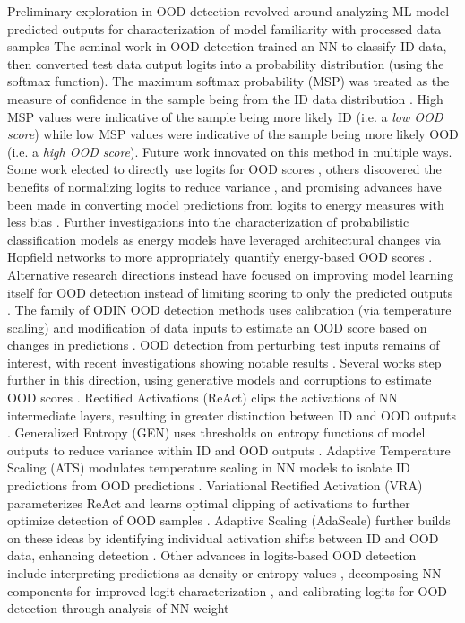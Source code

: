 Preliminary exploration in OOD detection revolved around analyzing ML model predicted outputs for characterization of model familiarity with processed data samples \cite{yang2024generalized,lu2024recent} The seminal work in OOD detection trained an NN to classify ID data, then converted test data output logits into a probability distribution (using the softmax function). The maximum softmax probability (MSP) was treated as the measure of confidence in the sample being from the ID data distribution \cite{hendrycks2017baseline}. High MSP values were indicative of the sample being more likely ID (i.e. a \textit{low OOD score}) while low MSP values were indicative of the sample being more likely OOD (i.e. a \textit{high OOD score}). Future work innovated on this method in multiple ways. Some work elected to directly use logits for OOD scores \cite{hendrycks2019scaling}, others discovered the benefits of normalizing logits to reduce variance \cite{wei2022mitigating}, and promising advances have been made in converting model predictions from logits to energy measures with less bias \cite{liu2020energy,wang2021energy,chen2025dual}. Further investigations into the characterization of probabilistic classification models as energy models have leveraged architectural changes via Hopfield networks to more appropriately quantify energy-based OOD scores \cite{zhang2022out,hofmann2024energy,hofmannenergy,moriai2025rectified}. Alternative research directions instead have focused on improving model learning itself for OOD detection instead of limiting scoring to only the predicted outputs \cite{liu2024fast}. The family of ODIN OOD detection methods uses calibration (via temperature scaling) and modification of data inputs to estimate an OOD score based on changes in predictions \cite{liang2017enhancing,hsu2020generalized}. OOD detection from perturbing test inputs remains of interest, with recent investigations showing notable results \cite{chen2025leveraging}. Several works step further in this direction, using generative models and corruptions to estimate OOD scores \cite{lee2025hybood}. Rectified Activations (ReAct) clips the activations of NN intermediate layers, resulting in greater distinction between ID and OOD outputs \cite{sun2021react}. Generalized Entropy (GEN) uses thresholds on entropy functions of model outputs to reduce variance within ID and OOD outputs \cite{liu2023gen}. Adaptive Temperature Scaling (ATS) modulates temperature scaling in NN models to isolate ID predictions from OOD predictions \cite{krumpl2024ats}. Variational Rectified Activation (VRA) parameterizes ReAct and learns optimal clipping of activations to further optimize detection of OOD samples \cite{xu2024vra}. Adaptive Scaling (AdaScale) further builds on these ideas by identifying individual activation shifts between ID and OOD data, enhancing detection \cite{regmi2025adascale}. Other advances in logits-based OOD detection include interpreting predictions as density or entropy values \cite{abati2019latent,pidhorskyi2018generative,zong2018deep,yang2025eood}, decomposing NN components for improved logit characterization \cite{hsu2020generalized,huang2021mos,huang2021importance,devries2018learning,chen2023gaia,yu2023block,chen2024optimal}, and calibrating logits for OOD detection through analysis of NN weight 